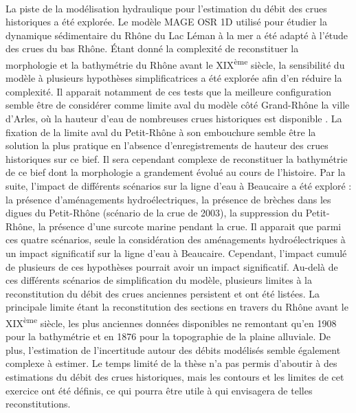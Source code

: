 \documentclass[11pt]{article}
\begin{document}
	\paragraph{} La piste de la modélisation hydraulique pour l'estimation du débit des crues historiques a été explorée. Le modèle MAGE OSR 1D utilisé pour étudier la dynamique sédimentaire du Rhône du Lac Léman à la mer a été adapté à l'étude des crues du bas Rhône. Étant donné la complexité de reconstituer la morphologie et la bathymétrie du Rhône avant le XIX\textsuperscript{ème} siècle, la sensibilité du modèle à plusieurs hypothèses simplificatrices a été explorée afin d'en réduire la complexité. Il apparait notamment de ces tests que la meilleure configuration semble être de considérer comme limite aval du modèle côté Grand-Rhône la ville d'Arles, où la hauteur d'eau de nombreuses crues historiques est disponible \citep{pichard_hauteurs_2013}. La fixation de la limite aval du Petit-Rhône à son embouchure semble être la solution la plus pratique en l'absence d'enregistrements de hauteur des crues historiques sur ce bief. Il sera cependant complexe de reconstituer la bathymétrie de ce bief dont la morphologie a grandement évolué au cours de l'histoire. Par la suite, l'impact de différents scénarios sur la ligne d'eau à Beaucaire a été exploré : la présence d'aménagements hydroélectriques, la présence de brèches dans les digues du Petit-Rhône (scénario de la crue de 2003), la suppression du Petit-Rhône, la présence d'une surcote marine pendant la crue. Il apparait que parmi ces quatre scénarios, seule la considération des aménagements hydroélectriques à un impact significatif sur la ligne d'eau à Beaucaire. Cependant, l'impact cumulé de plusieurs de ces hypothèses pourrait avoir un impact significatif. Au-delà de ces différents scénarios de simplification du modèle, plusieurs limites à la reconstitution du débit des crues anciennes persistent et ont été listées. La principale limite étant la reconstitution des sections en travers du Rhône avant le XIX\textsuperscript{ème} siècle, les plus anciennes données disponibles ne remontant qu'en 1908 pour la bathymétrie et en 1876 pour la topographie de la plaine alluviale. De plus, l'estimation de l'incertitude autour des débits modélisés semble également complexe à estimer. Le temps limité de la thèse n'a pas permis d'aboutir à des estimations du débit des crues historiques, mais les contours et les limites de cet exercice ont été définis, ce qui pourra être utile à qui envisagera de telles reconstitutions. 
	
\end{document}
